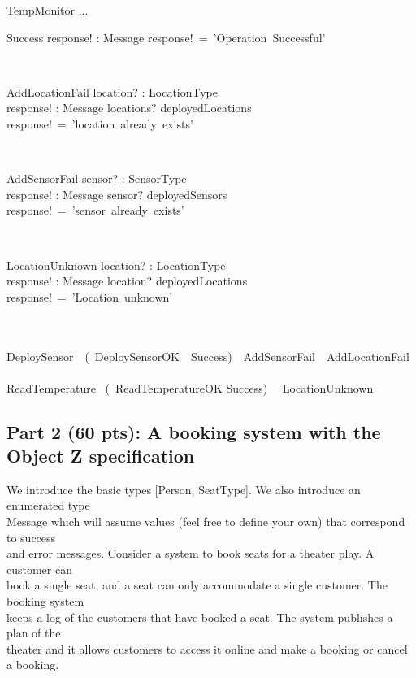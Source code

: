 \documentclass[12pt]{article}
\begin{document}
\begin{class}{TempMonitor}
...\\
\begin{op}{Success}
response! : Message
\ST
response!~=~'Operation~Successful'
\end{op}\\
\begin{op}{AddLocationFail}
location? : LocationType\\
response! : Message
\ST
locations? \in deployedLocations\\
response!~=~'location~already~exists'\\
\end{op}\\
\begin{op}{AddSensorFail}
sensor? : SensorType\\
response! : Message
\ST
sensor? \in deployedSensors\\
response!~=~'sensor~already~exists'
\end{op}\\
\begin{op}{LocationUnknown}
location? : LocationType\\
response! : Message
\ST
location? \notin deployedLocations\\
response!~=~'Location~unknown'
\end{op}\\
\ \\
DeploySensor~\hat{=}~(~DeploySensorOK~\barwedge~Success)~\underline{\vee}~AddSensorFail~\underline{\vee}~AddLocationFail\\
\ \\
ReadTemperature~\hat{=} (~ReadTemperatureOK \barwedge Success)~\underline{\vee}~ LocationUnknown
\end{class}
\newpage
\subsection{Part 2 (60 pts): A booking system with the Object Z specification}

\noindent We introduce the basic types [Person, SeatType]. We also introduce an enumerated type\\
Message which will assume values (feel free to define your own) that correspond to success\\
and error messages. Consider a system to book seats for a theater play. A customer can\\
book a single seat, and a seat can only accommodate a single customer. The booking system\\
keeps a log of the customers that have booked a seat. The system publishes a plan of the\\
theater and it allows customers to access it online and make a booking or cancel a booking.\\
\end{document}
